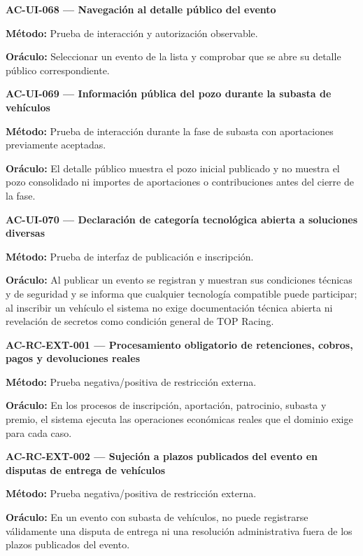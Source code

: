 \documentclass[10pt,letterpaper]{article}
\begin{document}
\noindent\textbf{AC-UI-068 --- Navegación al detalle público del evento}\par
\textbf{Método:} Prueba de interacción y autorización observable.\par
\textbf{Oráculo:} Seleccionar un evento de la lista y comprobar que se abre su detalle público correspondiente.\par\vspace{0.45em}
\noindent\textbf{AC-UI-069 --- Información pública del pozo durante la subasta de vehículos}\par
\textbf{Método:} Prueba de interacción durante la fase de subasta con aportaciones previamente aceptadas.\par
\textbf{Oráculo:} El detalle público muestra el pozo inicial publicado y no muestra el pozo consolidado ni importes de aportaciones o contribuciones antes del cierre de la fase.\par\vspace{0.45em}
\noindent\textbf{AC-UI-070 --- Declaración de categoría tecnológica abierta a soluciones diversas}\par
\textbf{Método:} Prueba de interfaz de publicación e inscripción.\par
\textbf{Oráculo:} Al publicar un evento se registran y muestran sus condiciones técnicas y de seguridad y se informa que cualquier tecnología compatible puede participar; al inscribir un vehículo el sistema no exige documentación técnica abierta ni revelación de secretos como condición general de TOP Racing.\par\vspace{0.45em}
\noindent\textbf{AC-RC-EXT-001 --- Procesamiento obligatorio de retenciones, cobros, pagos y devoluciones reales}\par
\textbf{Método:} Prueba negativa/positiva de restricción externa.\par
\textbf{Oráculo:} En los procesos de inscripción, aportación, patrocinio, subasta y premio, el sistema ejecuta las operaciones económicas reales que el dominio exige para cada caso.\par\vspace{0.45em}
\noindent\textbf{AC-RC-EXT-002 --- Sujeción a plazos publicados del evento en disputas de entrega de vehículos}\par
\textbf{Método:} Prueba negativa/positiva de restricción externa.\par
\textbf{Oráculo:} En un evento con subasta de vehículos, no puede registrarse válidamente una disputa de entrega ni una resolución administrativa fuera de los plazos publicados del evento.\par\vspace{0.45em}
\end{document}
